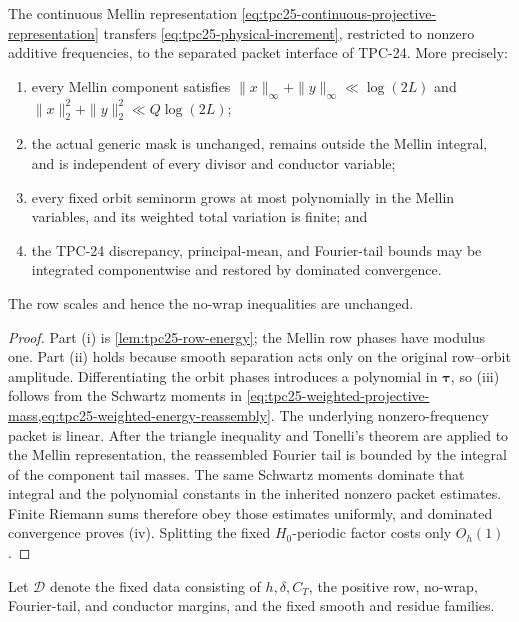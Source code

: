 \begin{lemma}
\label{lem:tpc25-interface-transfer}
The continuous Mellin representation
\eqref{eq:tpc25-continuous-projective-representation} transfers
\eqref{eq:tpc25-physical-increment}, restricted to nonzero additive
frequencies, to the separated packet interface of TPC-24.  More
precisely:
\begin{enumerate}[label=\textup{(\roman*)}]
 \item every Mellin component satisfies
 \(\|x\|_\infty+\|y\|_\infty\ll\log(2L)\) and
 \(\|x\|_2^2+\|y\|_2^2\ll Q\log(2L)\);
 \item the actual generic mask is unchanged, remains outside the
 Mellin integral, and is independent of every divisor and conductor
 variable;
 \item every fixed orbit seminorm grows at most polynomially in the
 Mellin variables, and its weighted total variation is finite; and
 \item the TPC-24 discrepancy, principal-mean, and Fourier-tail bounds
 may be integrated componentwise and restored by dominated
 convergence.
\end{enumerate}
The row scales and hence the no-wrap inequalities are unchanged.
\end{lemma}

\begin{proof}
Part (i) is \cref{lem:tpc25-row-energy}; the Mellin row phases have
modulus one.  Part (ii) holds because smooth separation acts only on
the original row--orbit amplitude.  Differentiating the orbit phases
introduces a polynomial in \(\boldsymbol\tau\), so (iii) follows from
the Schwartz moments in
\cref{eq:tpc25-weighted-projective-mass,eq:tpc25-weighted-energy-reassembly}.
The underlying nonzero-frequency packet is linear.  After the triangle
inequality and Tonelli's theorem are applied to the Mellin
representation, the reassembled Fourier tail is bounded by the
integral of the component tail masses.  The same Schwartz moments
dominate that integral and the polynomial constants in the inherited
nonzero packet estimates.  Finite Riemann sums therefore obey those
estimates uniformly, and dominated convergence proves (iv).  Splitting
the fixed \(H_0\)-periodic factor costs only \(O_h(1)\).
\end{proof}

Let \(\mathscr D\) denote the fixed data consisting of \(h,\delta,C_T\),
the positive row, no-wrap, Fourier-tail, and conductor margins, and the
fixed smooth and residue families.

